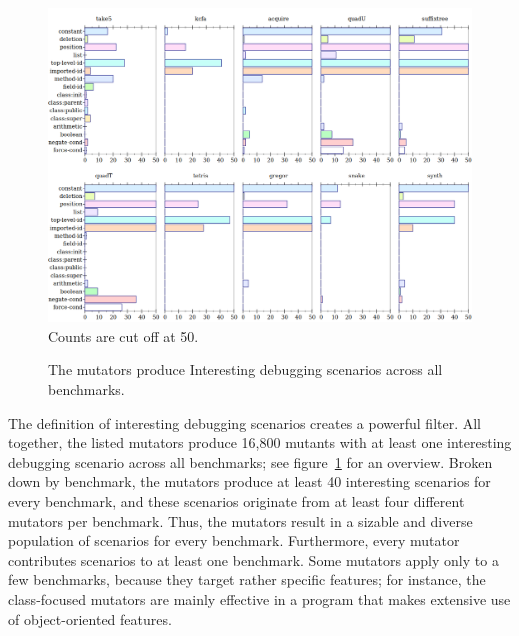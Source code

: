 \begin{figure} \footnotesize
 \centering
 \includegraphics[scale=0.33]{./plots/mutant-breakdown}
  Counts are cut off at 50.

\caption{The mutators produce Interesting debugging scenarios across all benchmarks.} 
 \label{fig:mutant-breakdown}
\end{figure}

The definition of interesting debugging scenarios creates a powerful filter. All
together, the listed mutators produce 16,800 mutants with at least one
interesting debugging scenario across all benchmarks; see
figure~\ref{fig:mutant-breakdown} for an overview. Broken down by benchmark, the
mutators produce at least 40 interesting scenarios for every benchmark, and
these scenarios originate from at least four different mutators per benchmark.
Thus, the mutators result in a sizable and diverse population of scenarios for
every benchmark.  Furthermore, every mutator contributes scenarios to at least
one benchmark.  Some mutators apply only to a few benchmarks, because they
target rather specific features; for instance, the class-focused mutators are
mainly effective in a program that makes extensive use of object-oriented
features.
